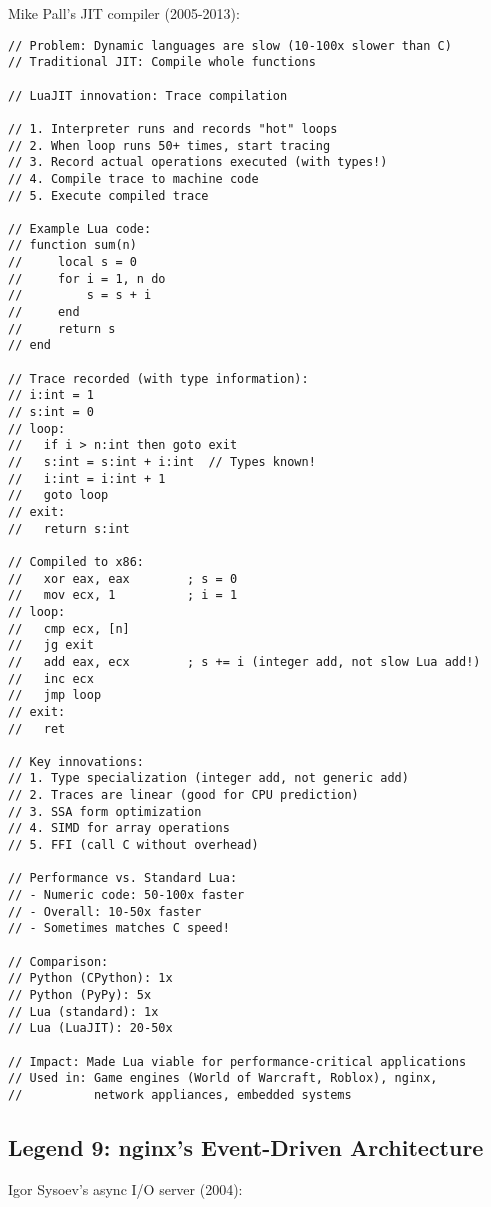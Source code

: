 Mike Pall's JIT compiler (2005-2013):

\begin{lstlisting}
// Problem: Dynamic languages are slow (10-100x slower than C)
// Traditional JIT: Compile whole functions

// LuaJIT innovation: Trace compilation

// 1. Interpreter runs and records "hot" loops
// 2. When loop runs 50+ times, start tracing
// 3. Record actual operations executed (with types!)
// 4. Compile trace to machine code
// 5. Execute compiled trace

// Example Lua code:
// function sum(n)
//     local s = 0
//     for i = 1, n do
//         s = s + i
//     end
//     return s
// end

// Trace recorded (with type information):
// i:int = 1
// s:int = 0
// loop:
//   if i > n:int then goto exit
//   s:int = s:int + i:int  // Types known!
//   i:int = i:int + 1
//   goto loop
// exit:
//   return s:int

// Compiled to x86:
//   xor eax, eax        ; s = 0
//   mov ecx, 1          ; i = 1
// loop:
//   cmp ecx, [n]
//   jg exit
//   add eax, ecx        ; s += i (integer add, not slow Lua add!)
//   inc ecx
//   jmp loop
// exit:
//   ret

// Key innovations:
// 1. Type specialization (integer add, not generic add)
// 2. Traces are linear (good for CPU prediction)
// 3. SSA form optimization
// 4. SIMD for array operations
// 5. FFI (call C without overhead)

// Performance vs. Standard Lua:
// - Numeric code: 50-100x faster
// - Overall: 10-50x faster
// - Sometimes matches C speed!

// Comparison:
// Python (CPython): 1x
// Python (PyPy): 5x
// Lua (standard): 1x
// Lua (LuaJIT): 20-50x

// Impact: Made Lua viable for performance-critical applications
// Used in: Game engines (World of Warcraft, Roblox), nginx,
//          network appliances, embedded systems
\end{lstlisting}

\subsection{Legend 9: nginx's Event-Driven Architecture}

Igor Sysoev's async I/O server (2004):

